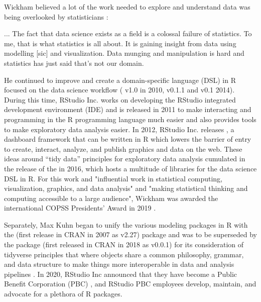 \documentclass[010-intro.tex]{subfiles}
\begin{document}
        Wickham believed a lot of the work needed to explore and understand data was being overlooked by statisticians
        \cite{smithHadleyWickhamWhy2015}:
        \begin{displayquote}
            ... The fact that data science exists as a field is a colossal failure of statistics.
            To me, that is what statistics is all about.
            It is gaining insight from data using modelling [sic] and visualization.
            Data munging and manipulation is hard and statistics has just said that's not our domain.
        \end{displayquote}
        He continued to improve and create a domain-specific language (DSL) in R focused on the data science workflow
        ( v1.0 in 2010,  v0.1.1 and  v0.1 2014).
        During this time,
        RStudio Inc. works on developing the RStudio integrated development environment (IDE)
        and is released in 2011 to make interacting and programming
        in the R programming language much easier and also provides tools to make exploratory data analysis easier.
        In 2012, RStudio Inc. releases ,
        a dashboard framework that can be written in R which
        lowers the barrier of entry to create, interact, analyze, and publish graphics and data on the web.
        These ideas around ``tidy data'' principles for exploratory data analysis
        \cite{wickhamTidyData2014}
        cumulated in the release of the  in 2016,
        which hosts a multitude of libraries for the data science DSL in R.
        For this work and "influential work in statistical computing, visualization, graphics, and data analysis" and
        "making statistical thinking and computing accessible to a large audience",
        Wickham was awarded the international COPSS Presidents' Award in 2019
        \cite{InstituteMathematicalStatistics2019}.

        Separately,
        Max Kuhn began to unify the various modeling packages in R with the 
        (first release in CRAN in 2007 as v2.27) package
        and was to be superseded by
        the  package
        (first released in CRAN in 2018 as v0.0.1)
        for its consideration of tidyverse principles that where objects share a common philosophy, grammar, and data structure
        to make things more interoperable in data and analysis pipelines
        \cite{wickhamR4ds, kuhnTidyModeling2021}.
        In 2020, RStudio Inc announced that they have become a Public Benefit Corporation (PBC)
        \cite{allaireRStudioPBC2020, rstudioRStudio},
        and RStudio PBC employees develop, maintain, and advocate for a plethora of R packages.
\end{document}
